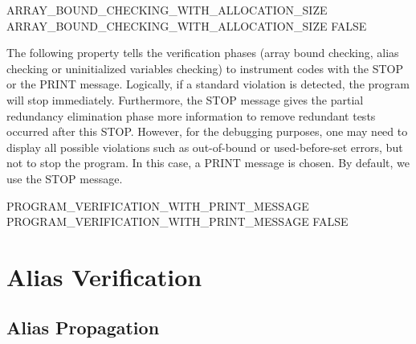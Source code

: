\documentclass[a4paper]{report}
\begin{document}
\begin{PipsProp}{ARRAY_BOUND_CHECKING_WITH_ALLOCATION_SIZE}
ARRAY_BOUND_CHECKING_WITH_ALLOCATION_SIZE FALSE
\end{PipsProp}

The following property tells the verification phases (array bound
checking, alias checking or uninitialized variables checking) to instrument
codes with the STOP or the PRINT message. Logically, if a standard violation
is detected, the program will stop immediately. Furthermore, the STOP message gives the
partial redundancy elimination phase more information to remove
redundant tests occurred after this STOP. However, for the debugging
purposes, one may need to display all possible violations such as
out-of-bound or used-before-set errors, but not
to stop the program. In this case, a PRINT message is chosen. By default,
we use the STOP message.

\begin{PipsProp}{PROGRAM_VERIFICATION_WITH_PRINT_MESSAGE}
PROGRAM_VERIFICATION_WITH_PRINT_MESSAGE FALSE
\end{PipsProp}



\section{Alias Verification}
\label{subsection-alias-verification}

\subsection{Alias Propagation}
\label{subsubsection-alias-propagation}
\end{document}
